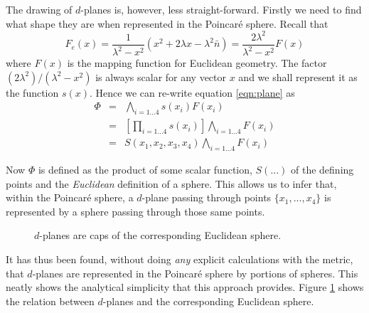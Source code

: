 The drawing of $d$-planes is, however, less straight-forward. Firstly we
need to find what shape they are when represented in the Poincar\'e sphere.
Recall that
\[
F_e(x) = \frac{1}{\lambda^2 - x^2} (x^2 + 2\lambda x - \lambda^2\bar{n})
 =  \frac{2\lambda^2}{\lambda^2 - x^2} F(x)
\]
where $F(x)$ is the mapping function for Euclidean geometry. The factor
$(2\lambda^2) / (\lambda^2 - x^2)$ is always scalar for any vector
$x$ and we shall represent it as the function $s(x)$. Hence we can
re-write equation \ref{eqn:plane} as
\begin{eqnarray}
\Phi & = & \bigwedge_{i = 1...4} s(x_i)F(x_i) \\
     & = & \left[\prod_{i = 1...4} s(x_i)\right] \bigwedge_{i = 1...4} F(x_i) \\
     & = & S(x_1, x_2, x_3, x_4) \bigwedge_{i = 1...4} F(x_i) 
\end{eqnarray}

Now $\Phi$ is defined as the product of some scalar function, $S(...)$
of the defining points and the \emph{Euclidean} definition of a sphere. This
allows us to infer that, within the Poincar\'e sphere, a $d$-plane passing
through points $\{x_1, ..., x_4\}$ is represented by a sphere passing
through those same points.

\begin{figure} \centering
{}
\caption{$d$-planes are caps of the corresponding Euclidean sphere.}
\label{fig:dplane}
\end{figure}

It has thus been found, without doing \emph{any} explicit calculations with
the metric, that
$d$-planes are represented in the Poincar\'e sphere by portions of spheres.
This neatly shows the analytical simplicity that this approach provides.
Figure \ref{fig:dplane} shows the
relation between $d$-planes and the corresponding Euclidean sphere.


